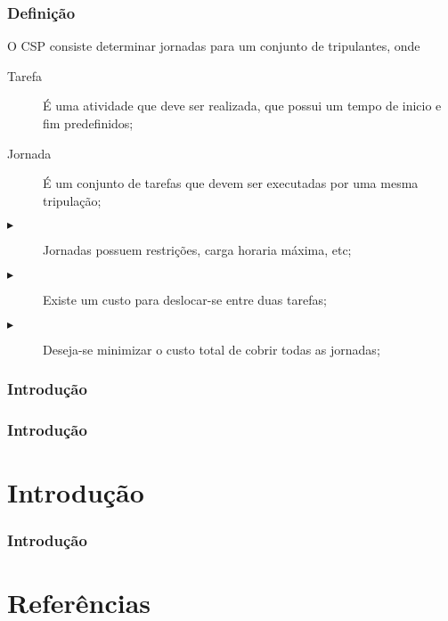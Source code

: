 \documentclass{beamer}
\begin{document}
\begin{frame}
    \frametitle{Definição}

    O CSP consiste determinar jornadas para um conjunto de tripulantes, onde

    \begin{description}
        \item[Tarefa] É uma atividade que deve ser realizada, que possui um tempo de inicio e fim predefinidos;
        \item[Jornada] É um conjunto de tarefas que devem ser executadas por uma mesma tripulação;
        \item[$\blacktriangleright$]Jornadas possuem restrições, carga horaria máxima, etc;
        \item[$\blacktriangleright$]Existe um custo para deslocar-se entre duas tarefas;
        \item[$\blacktriangleright$]Deseja-se minimizar o custo total de cobrir todas as jornadas;
    \end{description}
\end{frame}

\begin{frame}
    \frametitle{Introdução}

\end{frame}

\begin{frame}
    \frametitle{Introdução}

\end{frame}

\section{Introdução}
\begin{frame}
    \frametitle{Introdução}

\end{frame}

\section{Referências}

\begin{frame}
    \printbibliography
\end{frame}
\end{document}
